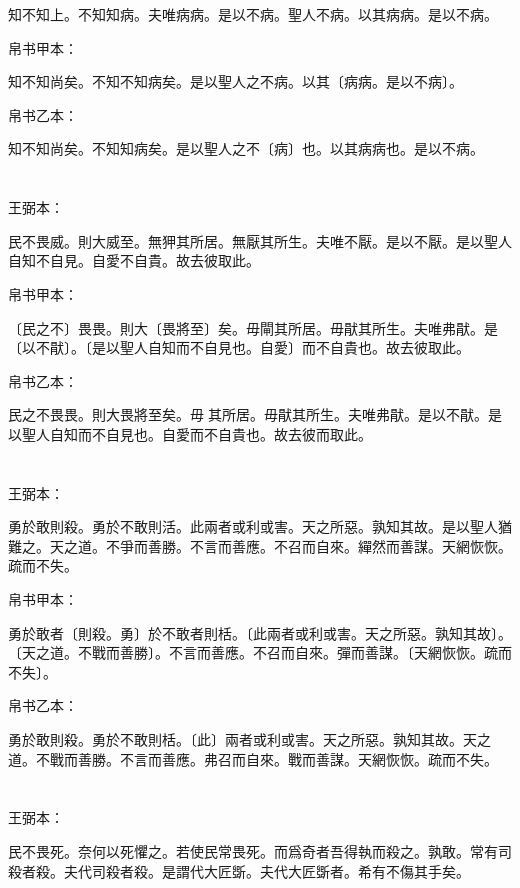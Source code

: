 \documentclass[a5paper]{ctexbook}
\begin{document}
    知不知上。不知知病。夫唯病病。是以不病。聖人不病。以其病病。是以不病。

    
    帛书甲本：

    知不知尚矣。不知不知病矣。是以聖人之不病。以其〔病病。是以不病〕。

    帛书乙本：

    知不知尚矣。不知知病矣。是以聖人之不〔病〕也。以其病病也。是以不病。

    \chapter{}
    王弼本：

    民不畏威。則大威至。無狎其所居。無厭其所生。夫唯不厭。是以不厭。是以聖人自知不自見。自愛不自貴。故去彼取此。

    
    帛书甲本：

    〔民之不〕畏畏。則大〔畏將至〕矣。毋閘其所居。毋猒其所生。夫唯弗猒。是〔以不猒〕。〔是以聖人自知而不自見也。自愛〕而不自貴也。故去彼取此。

    帛书乙本：

    民之不畏畏。則大畏將至矣。毋𠇺其所居。毋猒其所生。夫唯弗猒。是以不猒。是以聖人自知而不自見也。自愛而不自貴也。故去彼而取此。

    \chapter{}
    王弼本：

    勇於敢則殺。勇於不敢則活。此兩者或利或害。天之所惡。孰知其故。是以聖人猶難之。天之道。不爭而善勝。不言而善應。不召而自來。繟然而善謀。天網恢恢。疏而不失。

    
    帛书甲本：

    勇於敢者〔則殺。勇〕於不敢者則栝。〔此兩者或利或害。天之所惡。孰知其故〕。〔天之道。不戰而善勝〕。不言而善應。不召而自來。彈而善謀。〔天網恢恢。疏而不失〕。

    帛书乙本：

    勇於敢則殺。勇於不敢則栝。〔此〕兩者或利或害。天之所惡。孰知其故。天之道。不戰而善勝。不言而善應。弗召而自來。戰而善謀。天網恢恢。疏而不失。

    \chapter{}
    王弼本：

    民不畏死。奈何以死懼之。若使民常畏死。而爲奇者吾得執而殺之。孰敢。常有司殺者殺。夫代司殺者殺。是謂代大匠斲。夫代大匠斲者。希有不傷其手矣。
\end{document}
